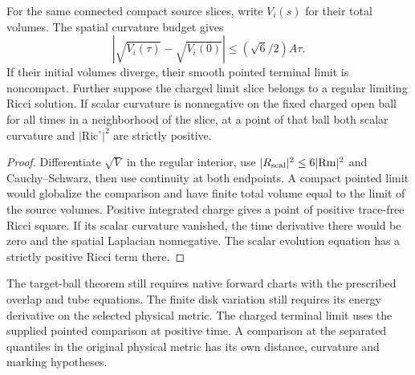 \begin{proposition}
\label{prop:ed03-volume-and-scalar}
\leanok
For the same connected compact source slices, write $V_i(s)$ for their
total volumes. The spatial curvature budget gives
\[
 |\sqrt{V_i(\tau)}-\sqrt{V_i(0)}|
 \le (\sqrt 6/2)A\tau .
\]
If their initial volumes diverge, their smooth pointed terminal limit
is noncompact. Further suppose the charged limit slice belongs to a
regular limiting Ricci solution. If scalar curvature is nonnegative
on the fixed charged open ball for all times in a neighborhood of the
slice, at a point of that ball both scalar curvature and
$|\mathrm{Ric}^{\circ}|^2$ are strictly positive.
\end{proposition}
\begin{proof}
\leanok
Differentiate $\sqrt{V}$ in the regular interior, use
$|R_{\rm scal}|^2\le6|\mathrm{Rm}|^2$ and Cauchy--Schwarz, then use
continuity at both endpoints. A compact pointed limit would globalize
the comparison and have finite total volume equal to the limit of the
source volumes. Positive integrated charge gives a point of positive
trace-free Ricci square. If its scalar curvature vanished, the time
derivative there would be zero and the spatial Laplacian nonnegative.
The scalar evolution equation has a strictly positive Ricci term there.
\end{proof}

The target-ball theorem still requires native forward charts with the
prescribed overlap and tube equations. The finite disk variation still
requires its energy derivative on the selected physical metric. The
charged terminal limit uses the supplied pointed comparison at positive
time. A comparison at the separated quantiles in the original physical
metric has its own distance, curvature and marking hypotheses.

